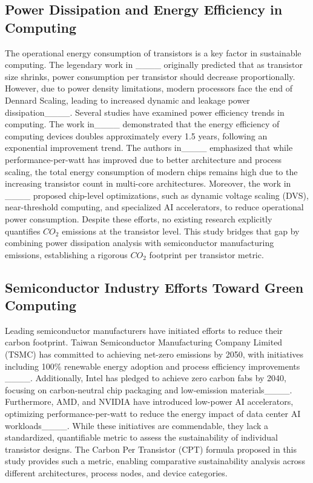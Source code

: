 \subsection{Power Dissipation and Energy Efficiency in Computing}
The operational energy consumption of transistors is a key factor in sustainable computing. The legendary work in ____ originally predicted that as transistor size shrinks, power consumption per transistor should decrease proportionally. However, due to power density limitations, modern processors face the end of Dennard Scaling, leading to increased dynamic and leakage power dissipation____.
Several studies have examined power efficiency trends in computing. The work in____ demonstrated that the energy efficiency of computing devices doubles approximately every 1.5 years, following an exponential improvement trend. The authors in____ emphasized that while performance-per-watt has improved due to better architecture and process scaling, the total energy consumption of modern chips remains high due to the increasing transistor count in multi-core architectures. Moreover, the work in ____ proposed chip-level optimizations, such as dynamic voltage scaling (DVS), near-threshold computing, and specialized AI accelerators, to reduce operational power consumption. Despite these efforts, no existing research explicitly quantifies $CO_2$ emissions at the transistor level. This study bridges that gap by combining power dissipation analysis with semiconductor manufacturing emissions, establishing a rigorous $CO_2$ footprint per transistor metric.

\subsection{Semiconductor Industry Efforts Toward Green Computing}
Leading semiconductor manufacturers have initiated efforts to reduce their carbon footprint. Taiwan Semiconductor Manufacturing Company Limited (TSMC) has committed to achieving net-zero emissions by 2050, with initiatives including 100\% renewable energy adoption and process efficiency improvements ____. Additionally, Intel has pledged to achieve zero carbon fabs by 2040, focusing on carbon-neutral chip packaging and low-emission materials____. Furthermore, AMD, and NVIDIA have introduced low-power AI accelerators, optimizing performance-per-watt to reduce the energy impact of data center AI workloads____. While these initiatives are commendable, they lack a standardized, quantifiable metric to assess the sustainability of individual transistor designs. The Carbon Per Transistor (CPT) formula proposed in this study provides such a metric, enabling comparative sustainability analysis across different architectures, process nodes, and device categories.

